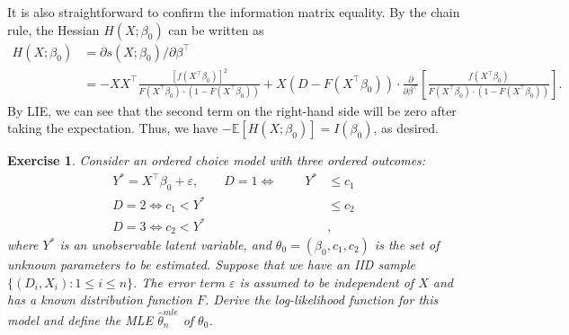 \documentclass[10.5pt, A4paper, openany, uplatex]{book}
\newcommand{\eps}{\varepsilon}
\newcommand{\E}{\mathbb{E}}
\renewcommand{\hat}{\widehat}
\newtheorem{exercise}[theorem]{Exercise}
\numberwithin{equation}{section}
\begin{document}
It is also straightforward to confirm the information matrix equality.
By the chain rule, the Hessian $H(X; \beta_0)$ can be written as
\begin{align*}
	H(X; \beta_0) 
	& = \partial s(X; \beta_0)/ \partial \beta^\top \\
	& = - XX^\top \frac{[f(X^\top \beta_0)]^2}{F(X^\top \beta_0) \cdot (1 -  F(X^\top\beta_0)) } + X (D - F(X^\top \beta_0)) \cdot \frac{\partial}{\partial \beta^\top} \left[ \frac{f(X^\top \beta_0)}{F(X^\top \beta_0) \cdot (1 -  F(X^\top\beta_0)) }\right].
\end{align*}
By LIE, we can see that the second term on the right-hand side will be zero after taking the expectation.
Thus, we have $-\E[H(X; \beta_0) ] = I(\beta_0)$, as desired.

\begin{framed}
\begin{exercise}\upshape
	Consider an ordered choice model with three ordered outcomes:
	\begin{align*}
	Y^* 
	= X^\top\beta_0 + \eps, \qquad D = 1 \iff  \qquad\:  Y^* & \le c_1 \\
	D = 2  \iff c_1 < Y^* & \le c_2 \\
	D = 3  \iff c_2 < Y^* &,
	\end{align*}
	where $Y^*$ is an unobservable latent variable, and $\theta_0 = (\beta_0, c_1, c_2)$ is the set of unknown parameters to be estimated.
	Suppose that we have an IID sample $\{(D_i, X_i): 1 \le i \le n\}$.
	The error term $\eps$ is assumed to be independent of $X$ and has a known distribution function $F$.
	Derive the log-likelihood function for this model and define the MLE $\hat \theta_n^{mle}$ of $\theta_0$.
\end{exercise}
\end{framed}
\end{document}
